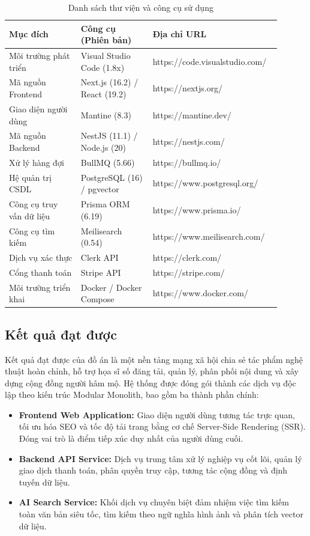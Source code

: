 \begin{table}[h!]
\caption{Danh sách thư viện và công cụ sử dụng}
\label{table:4_5}
\centering
\small
\renewcommand{\arraystretch}{1.2}
\begin{tabular}{|p{0.25\linewidth}|p{0.25\linewidth}|p{0.4\linewidth}|}
\hline
\textbf{Mục đích} & \textbf{Công cụ (Phiên bản)} & \textbf{Địa chỉ URL} \\ \hline
Môi trường phát triển & Visual Studio Code (1.8x) & https://code.visualstudio.com/ \\ \hline
Mã nguồn Frontend & Next.js (16.2) / React (19.2) & https://nextjs.org/ \\ \hline
Giao diện người dùng & Mantine (8.3) & https://mantine.dev/ \\ \hline
Mã nguồn Backend & NestJS (11.1) / Node.js (20) & https://nestjs.com/ \\ \hline
Xử lý hàng đợi & BullMQ (5.66) & https://bullmq.io/ \\ \hline
Hệ quản trị CSDL & PostgreSQL (16) / pgvector & https://www.postgresql.org/ \\ \hline
Công cụ truy vấn dữ liệu & Prisma ORM (6.19) & https://www.prisma.io/ \\ \hline
Công cụ tìm kiếm & Meilisearch (0.54) & https://www.meilisearch.com/ \\ \hline
Dịch vụ xác thực & Clerk API & https://clerk.com/ \\ \hline
Cổng thanh toán & Stripe API & https://stripe.com/ \\ \hline
Môi trường triển khai & Docker / Docker Compose & https://www.docker.com/ \\ \hline
\end{tabular}
\end{table}
\FloatBarrier

\subsection{Kết quả đạt được}
Kết quả đạt được của đồ án là một nền tảng mạng xã hội chia sẻ tác phẩm nghệ thuật hoàn chỉnh, hỗ trợ họa sĩ số đăng tải, quản lý, phân phối nội dung và xây dựng cộng đồng người hâm mộ. Hệ thống được đóng gói thành các dịch vụ độc lập theo kiến trúc Modular Monolith, bao gồm ba thành phần chính:
\begin{itemize}
    \item \textbf{Frontend Web Application:} Giao diện người dùng tương tác trực quan, tối ưu hóa SEO và tốc độ tải trang bằng cơ chế Server-Side Rendering (SSR). Đóng vai trò là điểm tiếp xúc duy nhất của người dùng cuối.
    \item \textbf{Backend API Service:} Dịch vụ trung tâm xử lý nghiệp vụ cốt lõi, quản lý giao dịch thanh toán, phân quyền truy cập, tương tác cộng đồng và định tuyến dữ liệu.
    \item \textbf{AI Search Service:} Khối dịch vụ chuyên biệt đảm nhiệm việc tìm kiếm toàn văn bản siêu tốc, tìm kiếm theo ngữ nghĩa hình ảnh và phân tích vector dữ liệu.
\end{itemize}

